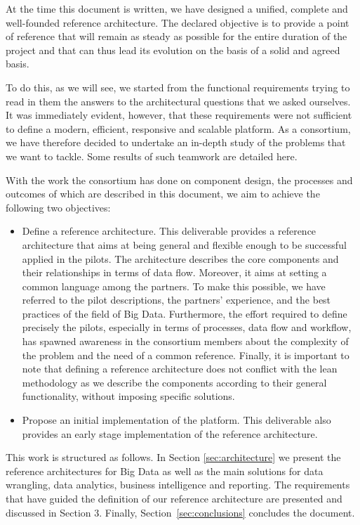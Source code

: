 At the time this document is written, we have designed a unified, complete and well-founded reference architecture. The declared objective is to provide a point of reference that will remain as steady as possible for the entire duration of the project and that can thus lead its evolution on the basis of a solid and agreed basis. 

To do this, as we will see, we started from the functional requirements trying to read in them the answers to the architectural questions that we asked ourselves.  It was immediately evident, however, that these requirements were not sufficient to define a modern, efficient, responsive and scalable platform. As a consortium, we have therefore decided to undertake an in-depth study of the problems that we want to tackle. Some results of such teamwork are detailed here.  

With the work the consortium has done on component design, the processes and outcomes of which are described in this document, we aim to achieve the following two objectives:
\begin{itemize}
    \item Define a reference architecture. This deliverable provides a reference architecture that aims at being general and flexible enough to be successful applied in the pilots. The architecture describes the core components and their relationships in terms of data flow. Moreover, it aims at setting a common language among the partners. To make this possible, we have referred to the pilot descriptions, the partners’ experience, and the best practices of the field of Big Data. Furthermore, the effort required to define precisely the pilots, especially in terms of processes, data flow and workflow, has spawned awareness in the consortium members about the complexity of the problem and the need of a common reference. Finally, it is important to note that defining a reference architecture does not conflict with the lean methodology as we describe the components according to their general functionality, without imposing specific solutions.
    \item Propose an initial implementation of the platform. This deliverable also provides an early stage implementation of the reference architecture.
\end{itemize}


This work is structured as follows. 
In Section \ref{sec:architecture} we present the reference architectures for Big Data as well as the main solutions for data wrangling, data analytics, business intelligence and reporting. 
The requirements that have guided the definition of our reference architecture are presented and discussed in Section 3. 
Finally, Section~\ref{sec:conclusions} concludes the document. 









